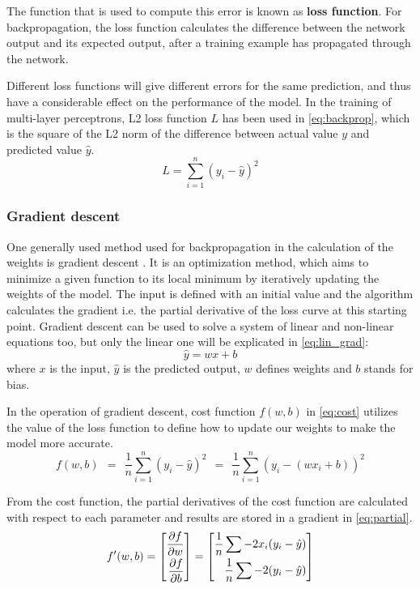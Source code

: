 The function that is used to compute this error is known as \textbf{loss function}. For backpropagation, the loss function calculates the difference between the network output and its expected output, after a training example has propagated through the network. \medskip

Different loss functions will give different errors for the same prediction, and thus have a considerable effect on the performance of the model. In the training of multi-layer perceptrons, L2 loss function $L$ has been used in \autoref{eq:backprop}, which is the square of the L2 norm of the difference between actual value $y$ and predicted value $\hat{y}$.
\begin{equation} L = \sum^n_{i=1}(y_i - \hat{y})^2 \label{eq:backprop} \end{equation}



\subsubsection{Gradient descent}

One generally used method used for backpropagation in the calculation of the weights is gradient descent \cite{anderson1995introduction}. It is an optimization method, which aims to minimize a given function to its local minimum by iteratively updating the weights of the model. The input is defined with an initial value and the algorithm calculates the gradient i.e. the partial derivative of the loss curve at this starting point. Gradient descent can be used to solve a system of linear and non-linear equations too, but only the linear one will be explicated in \autoref{eq:lin_grad}:
\begin{equation} \hat{y} = wx + b \label{eq:lin_grad} \end{equation}
where $x$ is the input, $\hat{y}$ is the predicted output, $w$ defines weights and $b$ stands for bias.\medskip

In the operation of gradient descent, cost function $f(w,b)$ in \autoref{eq:cost} utilizes the value of the loss function to define how to update our weights to make the model more accurate.
\begin{equation} f(w,b) ~~=~~ \frac{1}{n} \sum_{i=1}^n(y_i-\hat{y})^2 ~~=~~ \frac{1}{n} \sum_{i=1}^n(y_i-(wx_i+b))^2 \label{eq:cost} \end{equation}

From the cost function, the partial derivatives of the cost function are calculated with respect to each parameter and results are stored in a gradient in \autoref{eq:partial}.
\begin{equation} f'(w,b) = \bmatrix{ \aligned \frac{\partial f}{\partial w} \\
	\frac{\partial f}{\partial b} \endaligned }\endbmatrix
= \bmatrix{ \aligned \frac{1}{n} \sum - 2x_i(y_i-\hat{y}) \\
	\frac{1}{n} \sum - 2(y_i-\hat{y}) \endaligned }\endbmatrix \label{eq:partial} \end{equation}

